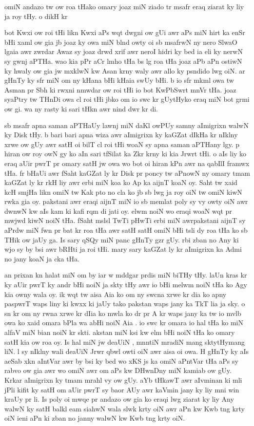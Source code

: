\documentclass[a4paper]{article}
\begin{document}
omiN andazo tw ow roa tHako omary joaz miN ziado tr msafr eraq ziarat ky liy ja roy tHy.
o dikH kr

bot Kwxi ow roi  tHi likn Kwxi aPs wqt dwgni ow gUi awr aPs miN hirt ka enSr bHi xaml ow gia jb joaz ky owa miN blnd owty oi sb msafrwN ny nero SlwaO lgaia awr zwrdar  Awaz sy joaz drwd xrif awr neroI hidri ky bed ia eli ky nerwN sy gwnj aPTHa.
wao kia pPr aCr lmho tHa bs lg roa tHa joaz aPb aPn ostiwN ky hwaly ow gia jw mxklwN kw Asan krny waly awr allo ky psndido lwg oiN.
ar gHnTy ky sfr miN om ny kHana bHi kHaia swUy bHi.
b io sfr mkml owa tw Asman pr  Sbh ki rwxni nmwdar ow roi tHi io bot KwPbSwrt mnVr tHa.
joaz syaPtry tw  THnDi owa cl roi tHi jbko om io swc kr gUytHyko eraq miN bot grmi ow gi.
wa ny rasty ki sari tHkn awr nind dwr kr di.

sb msafr  apna saman  aPTHaUy lawnj miN daKl owPUy samny aImigrixn walwN ky Disk tHy.
b bari bari apna wiza awr aImigrixn ky kaGZat dIkHa kr nIklny xrwe ow gUy awr satH oi bilT cl roi tHi woaN sy apna saman aPTHany lgy.
p hiran ow roy owN gy ko aIn sari tfSilat ka Zkr krny ki kia Jrwrt tHi.
o aIs liy ko eraq aUir pwrT pr omary satH jw owa wo bot oi  hiran kPn awr na qabIlI framwx tHa.
fr bHaUi awr  fSaht  kaGZat ly kr Disk pr poncy tw aPnowN ny omary tmam kaGZat ly kr rkH liy awr erbi miN koa ko Ap ka aijnT koaN oy.
Saht tw xaid kcH smjHa likn omiN tw Kak pto no cla ko jb sb lwg ja roy oiN tw omiN kiwN rwka gia oy.
pakstani awr eraqi  aijnT miN io sb memlat poly sy vy owty oiN awr dwnwN kw aIs  kam ki kafi rqm di jati oy.
elwm noiN wo eraqi woaN wqt pr mwjwd kiwN noiN tHa.
fSaht mslsl TwTi pHwTi erbi miN awrpakstani aijnT sy aPrdw miN fwn pr bat kr roa tHa awr satH satH omiN bHi tsli  dy roa tHa ko sb THik ow jaUy ga.
Is sary qSQy miN panc gHnTy gzr gUy.
rbi zban no Any ki wjo sy by bsi awr bRHti ja roi tHi.
mary sary kaGZat ly kr aImigrixn ka Admi no jany koaN ja cka tHa.

an prixan kn halat miN om by iar w mddgar prdis miN biTHy tHy.
laUn kras kr ky  aUir pwrT ky andr bHi noiN ja skty tHy awr io bHi melwm noiN tHa ko Agy kia owny wala oy.
ik wqt tw aisa Aia ko om ny swcna xrwe kr dia  ko apny paspwrT waps liny ki kwxx ki jaUy tako pakstan waps jany ka TkT lia ja sky.
o sn kr om ny rwna xrwe kr dIia ko mwla ko dr pr A kr waps jany ka tw io mvlb owa ko xaid omara bPla wa abHi noiN Aia .
io swc kr omara io hal tHa ko miN alfaV miN bian noiN kr skti.
akstan miN ksi kw elm bHi noiN tHa ko omary satH kia ow roa oy.
Is hal miN jw deaUiN , mnntiN mradiN mang sktytHymang liN.
l sy nIklny wali deaUiN Jrwr qbwl owti oiN awr aisa oi owa.
H gHnTy ky aIs aeSab xkn  aIntVar awr by bsi ky bed wo xKS js ka omiN aPntVar tHa aPs sy rabvo ow gia awr wo omiN awr om aPs kw DHwnDny miN kamiab ow gUy.
Krkar aImigrixn ky tmam mrahl vy ow gUy.
aYb  tHkawT awr  aIvminan ki mli jPli kifit ky satH om aUir pwrT sy baor AUy awr kaVmin jany ky  liy mni win kraUy pr li.
Is poly oi mwqe pr andazo ow gia ko eraqi lwg ziarat ky liy Any walwN ky satH balkl eam siahwN wala slwk krty oiN awr aPn kw Kwb tng krty oiN ieni aPn ki zban no janny walwN kw Kwb tng krty oiN.
\end{document}
